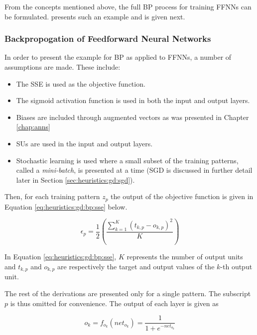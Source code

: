From the concepts mentioned above, the full \ac{BP} process for training \acp{FFNN} can be formulated. \citeauthor{ref:engelbrecht:2007} \cite{ref:engelbrecht:2007} presents such an example and is given next.

\subsubsection*{Backpropogation of Feedforward Neural Networks}

In order to present the example for \ac{BP} as applied to \acp{FFNN}, a number of assumptions are made. These include:

\begin{itemize}
    \item The \ac{SSE} is used as the objective function.
    \item The sigmoid activation function is used in both the input and output layers.
    \item Biases are included through augmented vectors as was presented in Chapter \ref{chap:anns}
    \item \Acp{SU} are used in the input and output layers.
    \item Stochastic learning is used where a small subset of the training patterns, called a \textit{mini-batch}, is presented at a time (\ac{SGD} is discussed in further detail later in Section \ref{sec:heuristics:gd:sgd}).
\end{itemize}

Then, for each training pattern $z_{p}$ the output of the objective function is given in Equation \ref{eq:heuristics:gd:bp:sse} below.

\begin{equation}
    \label{eq:heuristics:gd:bp:sse}
    \epsilon_{p} = \frac{1}{2}\left(\frac{\sum^{K}_{k=1}(t_{k,p} - o_{k,p})^{2}}{K}\right)
\end{equation}

In Equation \ref{eq:heuristics:gd:bp:sse}, $K$ represents the number of output units and $t_{k,p}$ and $o_{k,p}$ are respectively the target and output values of the $k$-th output unit.

The rest of the derivations are presented only for a single pattern. The subscript $p$ is thus omitted for convenience. The output of each layer is given as

\begin{equation}
    \label{eq:heuristics:gd:bp:output_1}
    o_{k} = f_{o_{k}}(net_{o_{k}}) = \frac{1}{1 + e^{-net_{o_{k}}}}
\end{equation}

